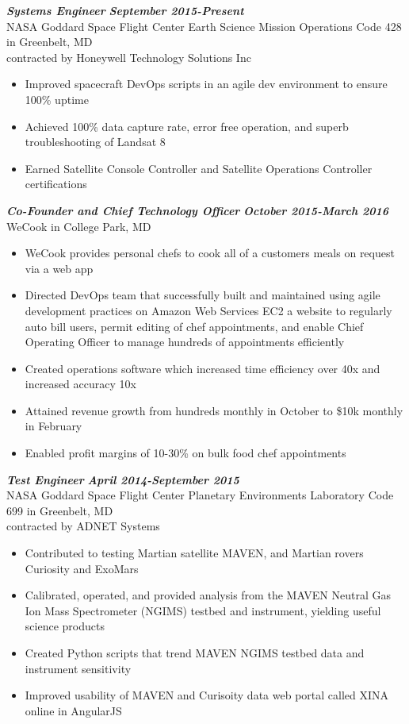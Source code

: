 \documentclass{res}
\begin{document}
\begin{resume}
	{\bfseries {\em Systems Engineer}}  \hfill  {\bfseries{\em September 2015-Present}}\\
		NASA Goddard Space Flight Center Earth Science Mission Operations Code 428 in Greenbelt, MD\\
		contracted by Honeywell Technology Solutions Inc
                \begin{itemize}  \itemsep -2pt %
		\item Improved spacecraft DevOps scripts in an agile dev environment to ensure 100\% uptime
		\item Achieved 100\% data capture rate, error free operation, and superb troubleshooting of Landsat 8
		\item Earned Satellite Console Controller and Satellite Operations Controller certifications
                \end{itemize}
	{\bfseries {\em Co-Founder and Chief Technology Officer}}  \hfill  {\bfseries{\em October 2015-March 2016}}\\
		WeCook in College Park, MD
                \begin{itemize}  \itemsep -2pt %
		\item WeCook provides personal chefs to cook all of a customers meals on request via a web app
		\item Directed DevOps team that successfully built and maintained using agile development practices on Amazon Web Services EC2 a website to regularly auto bill users, permit editing of chef appointments, and enable Chief Operating Officer to manage hundreds of appointments efficiently
		\item Created operations software which increased time efficiency over 40x and increased accuracy 10x
		\item Attained revenue growth from hundreds monthly in October to \$10k monthly in February
		\item Enabled profit margins of 10-30\% on bulk food chef appointments
                \end{itemize}
	{\bfseries {\em Test Engineer}}  \hfill  {\bfseries{\em April 2014-September 2015}}\\
		NASA Goddard Space Flight Center Planetary Environments Laboratory Code 699 in Greenbelt, MD\\
		contracted by ADNET Systems
                \begin{itemize}  \itemsep -2pt %
                \item  Contributed to testing Martian satellite MAVEN, and Martian rovers Curiosity and ExoMars
		\item Calibrated, operated, and provided analysis from the MAVEN Neutral Gas Ion Mass Spectrometer (NGIMS) testbed and instrument, yielding useful science products
		\item Created Python scripts that trend MAVEN NGIMS testbed data and instrument sensitivity
		\item Improved usability of MAVEN and Curisoity data web portal called XINA online in AngularJS
                \end{itemize}


\end{resume}
\end{document}
